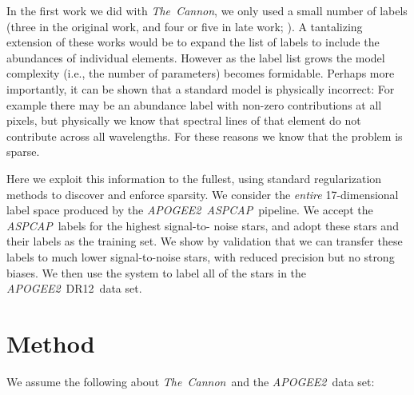 \documentclass[12pt,preprint]{aastex}
\newcommand{\project}[1]{\textsl{#1}}
\newcommand{\TheCannon}{\project{The~Cannon}}
\newcommand{\acronym}[1]{{\small{#1}}}
\newcommand{\apogee}{\project{\acronym{APOGEE2}}}
\newcommand{\aspcap}{\project{\acronym{ASPCAP}}}
\newcommand{\dr}{\acronym{DR12}}
\begin{document}
In the first work we did with \TheCannon, we only used a small
number of labels (three in the original work, and four or five in late
work; \citealt{tc, age}).  A tantalizing extension of these works would
be to expand the list of labels to include the abundances of individual
elements.  However as the label list grows the model complexity (i.e.,
the number of parameters) becomes formidable.  Perhaps more importantly,
it can be shown that a standard model is physically incorrect: For example
there may be an abundance label with non-zero contributions at all pixels,
but physically we know that spectral lines of that element do not contribute
across all wavelengths.  For these reasons we know that the problem is sparse.

Here we exploit this information to the fullest, using standard regularization methods to discover
and enforce sparsity. We consider the \emph{entire} 17-dimensional label space produced by the \apogee\ \aspcap\ pipeline. We accept the \aspcap\ labels for the highest signal-to- noise stars, and adopt these stars and their labels as the training set. We show by validation that we can transfer these labels to much lower signal-to-noise stars, with reduced precision but no strong biases. We then use the system to label all of the stars in the \apogee\ \dr\ data set.




\section{Method}

We assume the following about \TheCannon\ and the \apogee\ data set:
\end{document}
